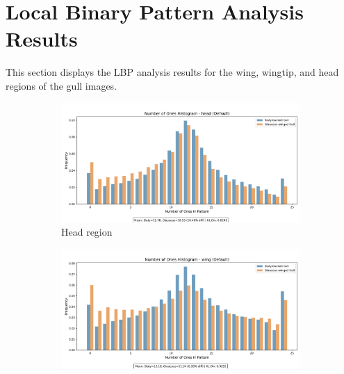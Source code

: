 \documentclass[a4paper,12pt]{report}
\begin{document}



\section{Local Binary Pattern Analysis Results}
\label{sec:lbp_analysis}

This section displays the LBP analysis results for the wing, wingtip, and head regions of the gull images.

\begin{figure}[H]
    \caption{Histograms for number of ones}
    \centering
    \begin{subfigure}[b]{0.32\textwidth}
        \includegraphics[width=\textwidth]{images/appendix/Number_of_Ones_Analysis/default_head_ones_histogram.png}
        \caption{Head region}
        \label{fig:lbp_head}
    \end{subfigure}
    \hfill
    \begin{subfigure}[b]{0.32\textwidth}
        \includegraphics[width=\textwidth]{images/appendix/Number_of_Ones_Analysis/default_wing_ones_histogram.png}

\end{subfigure}
\end{figure}
\end{document}
